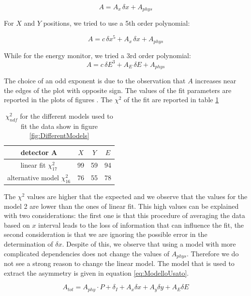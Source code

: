 \begin{equation}
A = A_{x} \, \delta x + A_{phys}
\end{equation}

For $X$ and $Y$ positions, we tried to use a 5th order polynomial:

\begin{equation}
A = c \, \delta x^{5} + A_{x} \, \delta x + A_{phys}
\end{equation}

While for the energy monitor, we tried a 3rd order polynomial:
\begin{equation}
A = c \, \delta E^{3} + A_{E} \, \delta E + A_{phys}
\end{equation}

The choice of an odd exponent is due to the observation that $A$ increases near the edges of the plot with opposite sign.
The values of the fit parameters are reported in the plots of figures . The $\chi^{2}$ of the fit are reported in table \ref{tab:ChisqDiffModel}

\begin{table}[!ht]
\centering
\begin{tabular}{c|c|c|c}
\hline 
detector A & $X$ & $Y$ & $E$ \\
\hline 
linear fit $\chi^{2}_{17}$ & 99 & 59 & 94 \\ 
alternative model $\chi^{2}_{16}$ & 76 & 55 & 78 \\ 
\end{tabular}
\caption{$\chi^{2} _{ndf}$ for the different models used to fit the data show in figure \ref{fig:DifferentModels}}
\label{tab:ChisqDiffModel}
\end{table}

The $\chi^{2}$ values are higher that the expected and we observe that the values for the model 2 are lower than the ones of linear fit.
This high values can be explained with two considerations: the first one is that this procedure of averaging the data based on $x$ interval leads to the loss of information that can influence the fit, the second consideration is that we are ignoring the possible error in the determination of $\delta x$.
Despite of this, we observe that using a model with more complicated dependencies does not change  the values of $A_{phys}$. Therefore we do not see a strong reason to change the linear model. The model that is used to extract the asymmetry is given in equation \ref{eq:ModelloUsato}. 

\begin{equation} \label{eq:ModelloUsato}
A_{tot} = A_{phy} \cdot P + \delta_{I} + A_{x} \delta x + A_{y} \delta y + A_{E} \delta E 
\end{equation}

